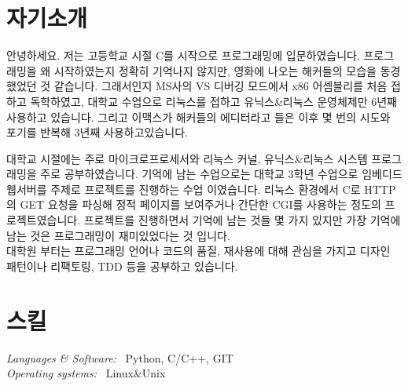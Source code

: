 \documentclass[line,margin]{res}
\begin{document}
\address{E-mail: vmfhrmfoaj@yahoo.com}


\begin{resume}

  \section{자기소개}

  안녕하세요.
  저는 고등학교 시절 C를 시작으로 프로그래밍에 입문하였습니다.
  프로그래밍을 왜 시작하였는지 정확히 기억나지 않지만, 영화에 나오는 해커들의 모습을 동경했었던 것 같습니다.
  그래서인지 MS사의 VS 디버깅 모드에서 x86 어셈블리를 처음 접하고 독학하였고,
  대학교 수업으로 리눅스를 접하고 유닉스\&리눅스 운영체제만 6년째 사용하고 있습니다.
  그리고 이맥스가 해커들의 에디터라고 들은 이후 몇 번의 시도와 포기를 반복해 3년째 사용하고있습니다.
  \vspace{-1mm}

  대학교 시절에는 주로 마이크로프로세서와 리눅스 커널, 유닉스\&리눅스 시스템 프로그래밍을 주로 공부하였습니다.
  기억에 남는 수업으로는 대학교 3학년 수업으로 임베디드 웹서버를 주제로 프로젝트를 진행하는 수업 이였습니다.
  리눅스 환경에서 C로 HTTP의 GET 요청을 파싱해 정적 페이지를 보여주거나 간단한 CGI를 사용하는 정도의 프로젝트였습니다.
  프로젝트를 진행하면서 기억에 남는 것들 몇 가지 있지만 가장 기억에 남는 것은 프로그래밍이 재미있었다는 것 입니다. \\
  대학원 부터는 프로그래밍 언어나 코드의 품질, 재사용에 대해 관심을 가지고 디자인 패턴이나 리팩토링, TDD 등을 공부하고 있습니다.



  \section{스킬}

  {\sl Languages \& Software:} ~Python, C/C++, GIT \\
  {\sl Operating systems:} ~Linux\&Unix



\end{resume}
\end{document}
